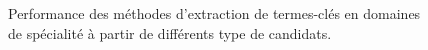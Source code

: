 \begin{figure}
      \caption{Performance des méthodes d'extraction de termes-clés en domaines
               de spécialité à partir de différents type de candidats.
               \label{fig:resultats}}
    \end{figure}

